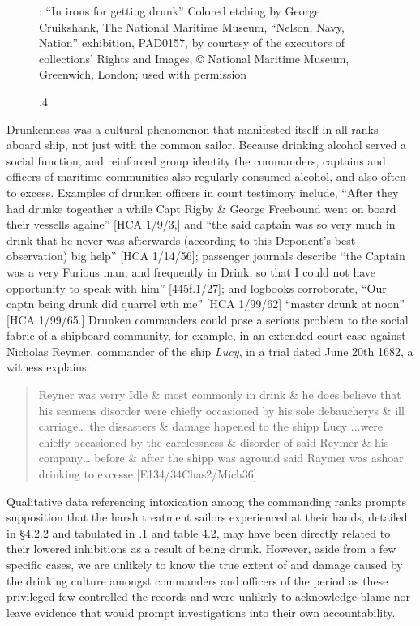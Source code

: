 
\begin{figure}

\caption{\label{fig:key:4}.4}: “In irons for getting drunk” Colored etching by George Cruikshank, The National Maritime Museum, “Nelson, Navy, Nation” exhibition, PAD0157, by courtesy of the executors of collections’ Rights and Images, © National Maritime Museum, Greenwich, London; used with permission
\end{figure}

Drunkenness was a cultural phenomenon that manifested itself in all ranks aboard ship, not just with the common sailor. Because drinking alcohol served a social function, and reinforced group identity \citep[13,]{Fury2015} the commanders, captains and officers of maritime communities also regularly consumed alcohol, and also often to excess. Examples of drunken officers in court testimony include, “After they had drunke togeather a while Capt Rigby \& George Freebound went on board their vessells againe” [HCA 1/9/3,] and “the said captain was so very much in drink that he never was afterwards (according to this Deponent’s best observation) big help” [HCA 1/14/56]; passenger journals describe “the Captain was a very Furious man, and frequently in Drink; so that I could not have opportunity to speak with him” [445f.1/27]; and logbooks corroborate, “Our captn being drunk did quarrel wth me” [HCA 1/99/62] “master drunk at noon” [HCA 1/99/65.] Drunken commanders could pose a serious problem to the social fabric of a shipboard community, for example, in an extended court case against Nicholas Reymer, commander of the ship \textit{Lucy}, in a trial dated June 20th 1682, a witness explains:

\begin{quotation}
Reyner was verry Idle \& most commonly in drink \& he does believe that his seamens disorder were chiefly occasioned by his sole debaucherys \& ill carriage… the dissasters \& damage hapened to the shipp Lucy ...were chiefly occasioned by the carelessness \& disorder of said Reymer \& his company… before \& after the shipp was aground said Raymer was ashoar drinking to excesse  [E134/34Chas2/Mich36]\end{quotation}

Qualitative data referencing intoxication among the commanding ranks prompts supposition that the harsh treatment sailors experienced at their hands, detailed in §4.2.2 and tabulated in .1 and table 4.2, may have been directly related to their lowered inhibitions as a result of being drunk. However, aside from a few specific cases, we are unlikely to know the true extent of and damage caused by the drinking culture amongst commanders and officers of the period as these privileged few controlled the records and were unlikely to acknowledge blame nor leave evidence that would prompt investigations into their own accountability.

